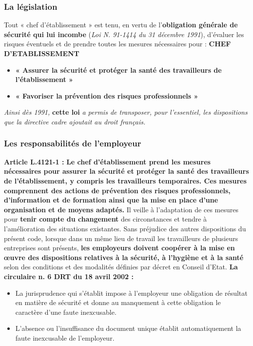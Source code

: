\documentclass{beamer}
\begin{document}
\begin{frame}
\frametitle{La législation}
Tout « chef d’établissement » est tenu, 
en vertu de l’\textbf{obligation générale de sécurité qui lui incombe} (\textit{Loi N. 91-1414 du 31 décembre 1991}), d’évaluer les risques éventuels et de prendre toutes les mesures nécessaires pour :
\textbf{CHEF D’ETABLISSEMENT}
\begin{itemize}
\item \textbf{« Assurer la sécurité et protéger la santé des travailleurs de l’établissement »}
\item \textbf{« Favoriser la prévention des risques professionnels »}
\end{itemize}
\textit{Ainsi dès 1991,} \textbf{cette loi}\textit{ a permis de transposer, pour l'essentiel, les dispositions que la directive cadre ajoutait au droit français.}

\end{frame}

\begin{frame}
\frametitle{Les responsabilités de l’employeur}
\textbf{Article L.4121-1 :}
\textbf{Le chef d'établissement prend les mesures nécessaires pour assurer la sécurité et protéger la santé des travailleurs de l'établissement, y compris les travailleurs temporaires. Ces mesures comprennent des actions de prévention des risques professionnels, d'information et de formation ainsi que la mise en place d'une organisation et de moyens adaptés.} Il veille à l'adaptation de ces mesures pour \textbf{tenir compte du changement} des circonstances et tendre à l'amélioration des situations existantes. 
Sans préjudice des autres dispositions du présent code, lorsque dans un même lieu de travail les travailleurs de plusieurs entreprises sont présents, \textbf{les employeurs doivent coopérer à la mise en œuvre des dispositions relatives à la sécurité, à l'hygiène et à la santé} selon des conditions et des modalités définies par décret en Conseil d'Etat.
\textbf{La circulaire n.  6 DRT du 18 avril 2002 :}
\begin{itemize}
\item La jurisprudence qui s'établit impose à l'employeur une obligation de résultat en matière de sécurité et donne au manquement à cette obligation le caractère d'une faute inexcusable.
\item L'absence ou l'insuffisance du document unique établit automatiquement la faute inexcusable de l'employeur. 
\end{itemize}
\end{frame}
\end{document}
